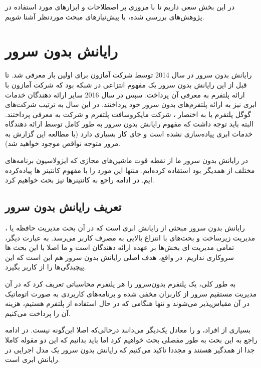 \label{literature}
در این بخش سعی داریم تا با مروری بر اصطلاحات و ابزارهای مورد استفاده در پژوهش‌های بررسی شده، با پیش‌نیازهای مبحث موردنظر آشنا شویم. 
\section{رایانش بدون سرور}
رایانش بدون سرور در سال 2014 توسط شرکت آمازون برای اولین بار معرفی شد. تا قبل از این رایانش بدون سرور یک مفهوم انتزاعی  در شبکه بود که شرکت آمازون با ارائه پلتفرم  \cite{aws} به معرفی آن پرداخت. سپس در سال 2016 سایر ارائه دهندگان خدمات ابری نیز به ارائه پلتفرم‌های بدون سرور خود پرداختند. در این سال به ترتیب شرکت‌های گوگل پلتفرم  یا به اختصار ، شرکت مایکروسافت پلتفرم  و شرکت  به معرفی  پرداختند. البته باید توجه داشت که مفهوم رایانش بدون سرور به طور کامل توسط ارائه دهندگاه خدمات ابری پیاده‌سازی نشده است و جای کار بسیاری دارد (با مطالعه این گزارش به مرور متوجه نواقص موجود خواهید شد).

در رایانش بدون سرور ما از نقطه قوت ماشین‌های مجازی که ایزولاسیون برنامه‌های مختلف از همدیگر بود استفاده کرده‌ایم. منتها این مورد را با مفهوم کانتینر ها پیاده‌کرده ایم. در ادامه راجع به کانتینرها نیز بحث خواهیم کرد. 

\subsection{تعریف رایانش بدون سرور}
\par
رایانش بدون سرور مبحثی از رایانش ابری است که در آن بحث مدیریت حافظه یا ، مدیریت زیرساخت و بحث‌های  با انتزاع بالایی به مصرف کاربر می‌رسد. به عبارت دیگر، تمامی مدیریت ای بخش‌ها بر عهده ارائه دهندگان است و ما اصلا با این بحث ها سروکاری نداریم. در واقع، هدف اصلی رایانش بدون سرور هم این است که این پیچیدگی‌ها را از کاربر بگیرد. 

\par
به طور کلی، یک‌ پلتفرم بدون‌سرور را هر پلتفرم محاسباتی تعریف کرد که در آن مدیریت مستقیم سرور از کاربران مخفی شده و برنامه‌های کاربردی به صورت اتوماتیک در آن مقیاس‌پذیر می‌شوند و تنها هنگامی که در حال استفاده از پلتفرم هستیم، هزینه آن را پرداخت می‌کنیم. \cite{The_Rise_of_Serverless_Computing}

\par
بسیاری از افراد،  و  را معادل یک‌دیگر می‌دانند درحالی‌که اصلا این‌گونه نیست. در ادامه راجع به این بحث به طور مفصلی بحث خواهیم کرد اما باید بدانیم که این دو مقوله کاملا جدا از همدگیر هستند و مجددا تاکید می‌کنیم که رایانش بدون سرور یک مدل اجرایی در رایانش ابری است. 


